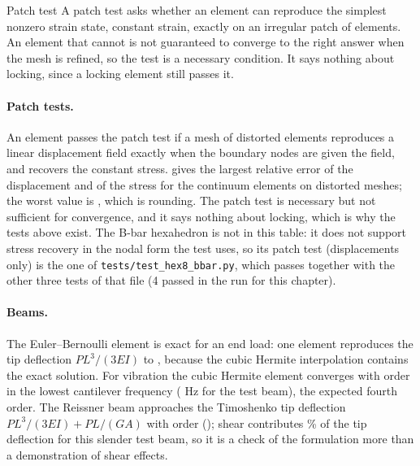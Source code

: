 \begin{sidenote}{Patch test}
A patch test asks whether an element can reproduce the simplest nonzero strain state, constant strain, exactly on an irregular patch of elements. An element that cannot is not guaranteed to converge to the right answer when the mesh is refined, so the test is a necessary condition. It says nothing about locking, since a locking element still passes it.
\end{sidenote}

\paragraph{Patch tests.}
An element passes the patch test if a mesh of distorted elements reproduces a linear displacement field exactly when the boundary nodes are given the field, and recovers the constant stress.  gives the largest relative error of the displacement and of the stress for the \cecPatchCount{} continuum elements on distorted meshes; the worst value is \cecPatchWorst{}, which is rounding. The patch test is necessary but not sufficient for convergence, and it says nothing about locking, which is why the tests above exist. The B-bar hexahedron is not in this table: it does not support stress recovery in the nodal form the test uses, so its patch test (displacements only) is the one of \texttt{tests/test\_hex8\_bbar.py}, which passes together with the other three tests of that file (4 passed in the run for this chapter).

\begin{table}[ht]
\centering\small

\caption{Patch tests on distorted meshes. The test helper is \texttt{\_patch} of \texttt{test\_benchmarks\_convergence.py}.}\label{tab:el-patch}
\end{table}

\paragraph{Beams.}
The Euler--Bernoulli element is exact for an end load: one element reproduces the tip deflection $PL^3/(3EI)$ to \cecEBTipErr, because the cubic Hermite interpolation contains the exact solution. For vibration the cubic Hermite element converges with order \cecEBFreqOrder{} in the lowest cantilever frequency (\cecEBFreqHz{} Hz for the test beam), the expected fourth order. The Reissner beam approaches the Timoshenko tip deflection $PL^3/(3EI)+PL/(GA)$ with order \cecTimoOrder{} (); shear contributes \cecTimoShearShare{}\% of the tip deflection for this slender test beam, so it is a check of the formulation more than a demonstration of shear effects.

